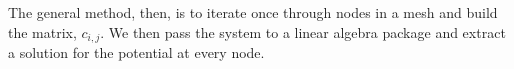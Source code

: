 \documentclass{PoS}
\begin{document}
The general method, then, is to iterate once through nodes in a mesh and build the matrix, $c_{i,j}$. We then pass the system to a linear algebra package and extract a solution for the potential at every node.

\end{document}
